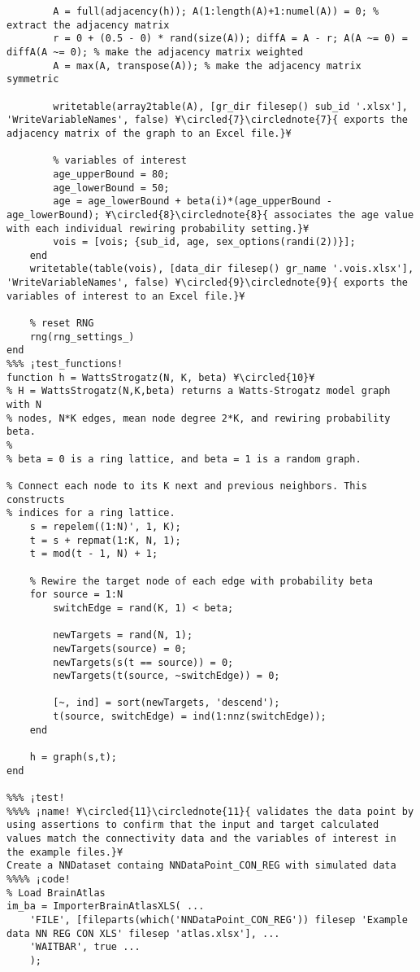 \documentclass{tufte-handout}
\begin{document}
\begin{lstlisting}
        A = full(adjacency(h)); A(1:length(A)+1:numel(A)) = 0; % extract the adjacency matrix
        r = 0 + (0.5 - 0) * rand(size(A)); diffA = A - r; A(A ~= 0) = diffA(A ~= 0); % make the adjacency matrix weighted
        A = max(A, transpose(A)); % make the adjacency matrix symmetric

        writetable(array2table(A), [gr_dir filesep() sub_id '.xlsx'], 'WriteVariableNames', false) ¥\circled{7}\circlednote{7}{ exports the adjacency matrix of the graph to an Excel file.}¥

        % variables of interest
        age_upperBound = 80;
        age_lowerBound = 50;
        age = age_lowerBound + beta(i)*(age_upperBound - age_lowerBound); ¥\circled{8}\circlednote{8}{ associates the age value with each individual rewiring probability setting.}¥
        vois = [vois; {sub_id, age, sex_options(randi(2))}];
    end
    writetable(table(vois), [data_dir filesep() gr_name '.vois.xlsx'], 'WriteVariableNames', false) ¥\circled{9}\circlednote{9}{ exports the variables of interest to an Excel file.}¥

    % reset RNG
    rng(rng_settings_)
end
%%% ¡test_functions!
function h = WattsStrogatz(N, K, beta) ¥\circled{10}¥
% H = WattsStrogatz(N,K,beta) returns a Watts-Strogatz model graph with N
% nodes, N*K edges, mean node degree 2*K, and rewiring probability beta.
%
% beta = 0 is a ring lattice, and beta = 1 is a random graph.

% Connect each node to its K next and previous neighbors. This constructs
% indices for a ring lattice.
    s = repelem((1:N)', 1, K);
    t = s + repmat(1:K, N, 1);
    t = mod(t - 1, N) + 1;
    
    % Rewire the target node of each edge with probability beta
    for source = 1:N
        switchEdge = rand(K, 1) < beta;
        
        newTargets = rand(N, 1);
        newTargets(source) = 0;
        newTargets(s(t == source)) = 0;
        newTargets(t(source, ~switchEdge)) = 0;
        
        [~, ind] = sort(newTargets, 'descend');
        t(source, switchEdge) = ind(1:nnz(switchEdge));
    end
    
    h = graph(s,t);
end

%%% ¡test! 
%%%% ¡name! ¥\circled{11}\circlednote{11}{ validates the data point by using assertions to confirm that the input and target calculated values match the connectivity data and the variables of interest in the example files.}¥
Create a NNDataset containg NNDataPoint_CON_REG with simulated data
%%%% ¡code!
% Load BrainAtlas
im_ba = ImporterBrainAtlasXLS( ...
    'FILE', [fileparts(which('NNDataPoint_CON_REG')) filesep 'Example data NN REG CON XLS' filesep 'atlas.xlsx'], ...
    'WAITBAR', true ...
    );


\end{lstlisting}
\end{document}
